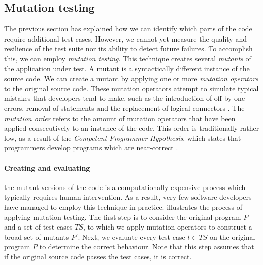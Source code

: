 \subsection{Mutation testing}\label{sssec:mutation-testing}
The previous section has explained how we can identify which parts of the code require additional test cases. However, we cannot yet measure the quality and resilience of the test suite nor its ability to detect future failures. To accomplish this, we can employ \emph{mutation testing}. This technique creates several \emph{mutants} of the application under test. A mutant is a syntactically different instance of the source code. We can create a mutant by applying one or more \emph{mutation operators} to the original source code. These mutation operators attempt to simulate typical mistakes that developers tend to make, such as the introduction of off-by-one errors, removal of statements and the replacement of logical connectors \cite{Offutt2001}. The \emph{mutation order} refers to the amount of mutation operators that have been applied consecutively to an instance of the code. This order is traditionally rather low, as a result of the \emph{Competent Programmer Hypothesis}, which states that programmers develop programs which are near-correct \cite{5487526}.

\paragraph*{Creating and evaluating} the mutant versions of the code is a computationally expensive process which typically requires human intervention. As a result, very few software developers have managed to employ this technique in practice.  illustrates the process of applying mutation testing. The first step is to consider the original program $P$ and a set of test cases $TS$, to which we apply mutation operators to construct a broad set of mutants $P'$. Next, we evaluate every test case $t \in TS$ on the original program $P$ to determine the correct behaviour. Note that this step assumes that if the original source code passes the test cases, it is correct. 

